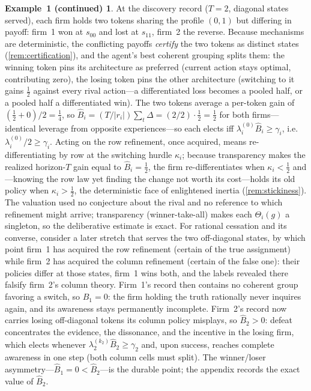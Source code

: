 \documentclass[11pt]{article}
\theoremstyle{definition}
\newtheorem*{excont}{Example~1 (continued)}
\begin{document}
\begin{excont}
At the discovery record ($T=2$, diagonal states served), each firm holds two tokens sharing the profile $(0,1)$ but differing in payoff: firm~1 won at $s_{00}$ and lost at $s_{11}$, firm~2 the reverse.
Because mechanisms are deterministic, the conflicting payoffs \emph{certify} the two tokens as distinct states (\cref{rem:certification}), and the agent's best coherent grouping splits them: the winning token pins its architecture as preferred (current action stays optimal, contributing zero), the losing token pins the other architecture (switching to it gains $\tfrac12$ against every rival action---a differentiated loss becomes a pooled half, or a pooled half a differentiated win).
The two tokens average a per-token gain of $(\tfrac12+0)/2=\tfrac14$, so $\widehat B_i=(T/\lvert r_i\rvert)\sum_t\Delta=(2/2)\cdot \tfrac12=\tfrac12$ for both firms---identical leverage from opposite experiences---so each elects iff $\lambda_i^{(0)}\widehat B_i\geq\gamma_i$, i.e.\ $\lambda_i^{(0)}/2\geq\gamma_i$.
Acting on the row refinement, once acquired, means re-differentiating by row at the switching hurdle $\kappa_i$; because transparency makes the realized horizon-$T$ gain equal to $\widehat B_i=\tfrac12$, the firm re-differentiates when $\kappa_i<\tfrac12$ and---knowing the row law yet finding the change not worth its cost---holds its old policy when $\kappa_i>\tfrac12$, the deterministic face of enlightened inertia (\cref{rem:stickiness}).
The valuation used no conjecture about the rival and no reference to which refinement might arrive; transparency (winner-take-all) makes each $\Theta_i(g)$ a singleton, so the deliberative estimate is exact.
For rational cessation and its converse, consider a later stretch that serves the two off-diagonal states, by which point firm~1 has acquired the row refinement (certain of the true assignment) while firm~2 has acquired the column refinement (certain of the false one): their policies differ at those states, firm~1 wins both, and the labels revealed there falsify firm~2's column theory.
Firm~1's record then contains no coherent group favoring a switch, so $\widehat B_1=0$: the firm holding the truth rationally never inquires again, and its awareness stays permanently incomplete.
Firm~2's record now carries losing off-diagonal tokens its column policy misplays, so $\widehat B_2>0$: defeat concentrates the evidence, the dissonance, and the incentive in the losing firm, which elects whenever $\lambda_2^{(k_2)}\widehat B_2\geq\gamma_2$ and, upon success, reaches complete awareness in one step (both column cells must split).
The winner/loser asymmetry---$\widehat B_1=0<\widehat B_2$---is the durable point; the appendix records the exact value of $\widehat B_2$.
\end{excont}
\end{document}
